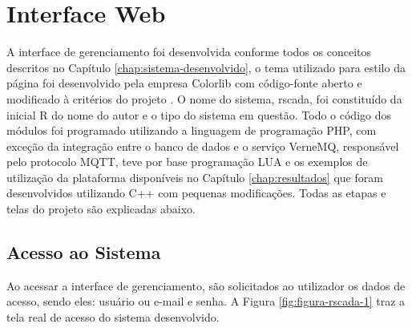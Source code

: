 \chapter{Interface Web}
\label{chap:interface-web}

A interface de gerenciamento foi desenvolvida conforme todos os conceitos descritos no Capítulo \ref{chap:sistema-desenvolvido}, o tema utilizado para estilo da página foi desenvolvido pela empresa Colorlib com código-fonte aberto e modificado à critérios do projeto \cite{Concept}. O nome do sistema, rscada,  foi constituído da inicial R do nome do autor e o tipo do sistema em questão. Todo o código dos módulos foi programado utilizando a linguagem de programação PHP, com exceção da integração entre o banco de dados e o serviço VerneMQ, responsável pelo protocolo MQTT, teve por base programação LUA e os exemplos de utilização da plataforma disponíveis no Capítulo \ref{chap:resultados} que foram desenvolvidos utilizando C++ com pequenas modificações. Todas as etapas e telas do projeto são explicadas abaixo.

\section{Acesso ao Sistema}
\label{sec:acesso-sistema}
Ao acessar a interface de gerenciamento, são solicitados ao utilizador os dados de acesso, sendo eles: usuário ou e-mail e senha. A Figura \ref{fig:figura-rscada-1} traz a tela real de acesso do sistema desenvolvido.

        \begin{figure}[!h]
    	\end{figure}

